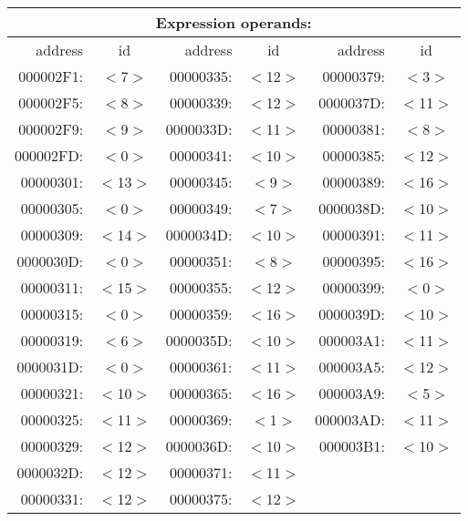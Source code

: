 \begin{center}\begin{tabular}{|r|c||r|c||r|c|}
\hline
\multicolumn{6}{|c|}{Expression operands:} \\
\hline
address & id & address & id & address & id \\
\hline\hline
000002F1: & $<$7$>$  & 00000335: & $<$12$>$ & 00000379: & $<$3$>$ \\
000002F5: & $<$8$>$  & 00000339: & $<$12$>$ & 0000037D: & $<$11$>$ \\
000002F9: & $<$9$>$  & 0000033D: & $<$11$>$ & 00000381: & $<$8$>$ \\
000002FD: & $<$0$>$  & 00000341: & $<$10$>$ & 00000385: & $<$12$>$ \\
00000301: & $<$13$>$ & 00000345: & $<$9$>$  & 00000389: & $<$16$>$ \\
00000305: & $<$0$>$  & 00000349: & $<$7$>$  & 0000038D: & $<$10$>$ \\
00000309: & $<$14$>$ & 0000034D: & $<$10$>$ & 00000391: & $<$11$>$ \\
0000030D: & $<$0$>$  & 00000351: & $<$8$>$  & 00000395: & $<$16$>$ \\
00000311: & $<$15$>$ & 00000355: & $<$12$>$ & 00000399: & $<$0$>$ \\
00000315: & $<$0$>$  & 00000359: & $<$16$>$ & 0000039D: & $<$10$>$ \\
00000319: & $<$6$>$  & 0000035D: & $<$10$>$ & 000003A1: & $<$11$>$ \\
0000031D: & $<$0$>$  & 00000361: & $<$11$>$ & 000003A5: & $<$12$>$ \\
00000321: & $<$10$>$ & 00000365: & $<$16$>$ & 000003A9: & $<$5$>$ \\
00000325: & $<$11$>$ & 00000369: & $<$1$>$  & 000003AD: & $<$11$>$ \\
00000329: & $<$12$>$ & 0000036D: & $<$10$>$ & 000003B1: & $<$10$>$ \\
0000032D: & $<$12$>$ & 00000371: & $<$11$>$ & & \\
00000331: & $<$12$>$ & 00000375: & $<$12$>$ & & \\
\hline
\end{tabular}\end{center}
